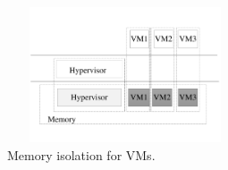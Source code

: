 \documentclass[conference]{IEEEtran}
\begin{document}
%

\begin{figure}
\centerline{\includegraphics[width=7cm, height=4cm]{pdfvmcs3.pdf}}%
\caption{Memory isolation for VMs.} \label{fig3}
\end{figure}
\end{document}
